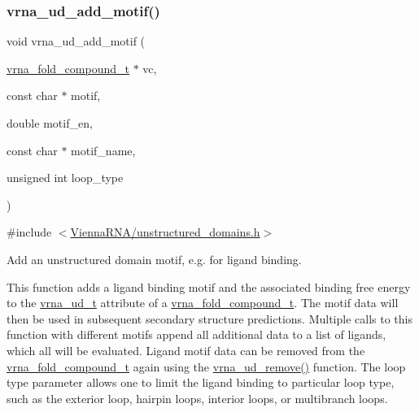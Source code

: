 \subsubsection{\texorpdfstring{vrna\_ud\_add\_motif()}{vrna\_ud\_add\_motif()}}
{\footnotesize\ttfamily void vrna\+\_\+ud\+\_\+add\+\_\+motif (\begin{DoxyParamCaption}\item[{\mbox{\hyperlink{group__fold__compound_ga1b0cef17fd40466cef5968eaeeff6166}{vrna\+\_\+fold\+\_\+compound\+\_\+t}} $\ast$}]{vc,  }\item[{const char $\ast$}]{motif,  }\item[{double}]{motif\+\_\+en,  }\item[{const char $\ast$}]{motif\+\_\+name,  }\item[{unsigned int}]{loop\+\_\+type }\end{DoxyParamCaption})}



{\ttfamily \#include $<$\mbox{\hyperlink{unstructured__domains_8h}{Vienna\+R\+N\+A/unstructured\+\_\+domains.\+h}}$>$}



Add an unstructured domain motif, e.\+g. for ligand binding. 

This function adds a ligand binding motif and the associated binding free energy to the \mbox{\hyperlink{group__domains__up_ga0009117b14d29143e8b18ab891f48c2d}{vrna\+\_\+ud\+\_\+t}} attribute of a \mbox{\hyperlink{group__fold__compound_ga1b0cef17fd40466cef5968eaeeff6166}{vrna\+\_\+fold\+\_\+compound\+\_\+t}}. The motif data will then be used in subsequent secondary structure predictions. Multiple calls to this function with different motifs append all additional data to a list of ligands, which all will be evaluated. Ligand motif data can be removed from the \mbox{\hyperlink{group__fold__compound_ga1b0cef17fd40466cef5968eaeeff6166}{vrna\+\_\+fold\+\_\+compound\+\_\+t}} again using the \mbox{\hyperlink{group__domains__up_gada59cb0c498b812eadd010811af3f2d4}{vrna\+\_\+ud\+\_\+remove()}} function. The loop type parameter allows one to limit the ligand binding to particular loop type, such as the exterior loop, hairpin loops, interior loops, or multibranch loops.

